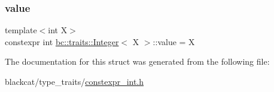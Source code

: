 \subsubsection{\texorpdfstring{value}{value}}
{\footnotesize\ttfamily template$<$int X$>$ \\
constexpr int \hyperlink{structbc_1_1traits_1_1Integer}{bc\+::traits\+::\+Integer}$<$ X $>$\+::value = X\hspace{0.3cm}{\ttfamily [static]}}



The documentation for this struct was generated from the following file\+:\begin{DoxyCompactItemize}
\item 
blackcat/type\+\_\+traits/\hyperlink{constexpr__int_8h}{constexpr\+\_\+int.\+h}\end{DoxyCompactItemize}
